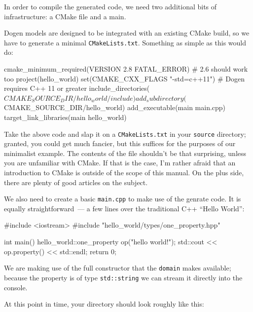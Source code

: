 \documentclass{book}
\begin{document}
In order to compile the generated code, we need two additional bits of
infrastructure: a CMake file and a main.

Dogen models are designed to be integrated with an existing CMake
build, so we have to generate a minimal
\texttt{CMakeLists.txt}. Something as simple as this would do:

\begin{pseudocode}[backgroundcolor=\color{lightgray}]
cmake_minimum_required(VERSION 2.8 FATAL_ERROR) # 2.6 should work too
project(hello_world)
set(CMAKE_CXX_FLAGS "-std=c++11") # Dogen requires C++ 11 or greater
include_directories(${CMAKE_SOURCE_DIR}/hello_world/include)
add_subdirectory(${CMAKE_SOURCE_DIR}/hello_world)
add_executable(main main.cpp)
target_link_libraries(main hello_world)
\end{pseudocode}

Take the above code and slap it on a \texttt{CMakeLists.txt} in your
\texttt{source} directory; granted, you could get much fancier, but
this suffices for the purposes of our minimalist example. The contents
of the file shouldn't be that surprising, unless you are unfamiliar
with CMake. If that is the case, I'm rather afraid that an
introduction to CMake is outside of the scope of this manual. On the
plus side, there are plenty of good articles on the subject.

We also need to create a basic \texttt{main.cpp} to make use of the
genrate code. It is equally straightforward~--- a few lines over the
traditional C++ ``Hello World'':

\begin{pseudocode}[backgroundcolor=\color{lightgray}]
#include <iostream>
#include "hello_world/types/one_property.hpp"

int main() {
    hello_world::one_property op("hello world!");
    std::cout << op.property() << std::endl;
    return 0;
}
\end{pseudocode}

We are making use of the full constructor that the \texttt{domain}
makes available; because the property is of type \texttt{std::string}
we can stream it directly into the console.

At this point in time, your directory should look roughly like this:

\end{document}
